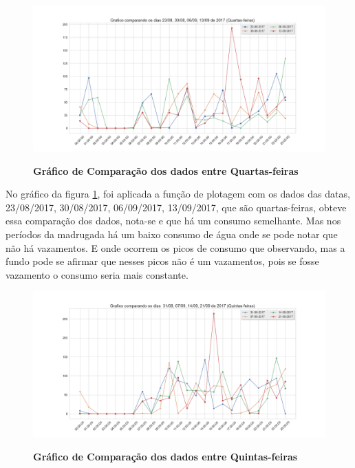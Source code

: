 \begin{figure}[ht]
	\caption{\textbf{Gráfico de Comparação dos dados entre Quartas-feiras}}
	\centering
		\includegraphics[width=\textwidth,height=\textheight , keepaspectratio]{figuras/Graficocomparandoosdias23-08,30-08,06-09,13-09de2017(Quartas-feiras)}
		\label{graf_quar}
\end{figure}
\par No gráfico da figura \ref{graf_quar}, foi aplicada a função de plotagem com os dados das datas, 23/08/2017, 30/08/2017, 06/09/2017, 13/09/2017, que são quartas-feiras, obteve essa comparação dos dados, nota-se e que há um consumo semelhante. Mas nos períodos da madrugada há um baixo consumo de água onde se pode notar que não há vazamentos. E onde ocorrem os picos de consumo que observando, mas a fundo pode se afirmar que nesses picos não é um vazamentos, pois se fosse vazamento o consumo seria mais constante.  
\begin{figure}[ht]
	\caption{\textbf{Gráfico de Comparação dos dados entre Quintas-feiras}}
	\centering
		\includegraphics[width=\textwidth,height=\textheight , keepaspectratio]{figuras/Graficocomparandoosdias31-08,07-09,14-09,21-09de2017(Quintas-feiras)}
		\label{graf_qui}
\end{figure}

